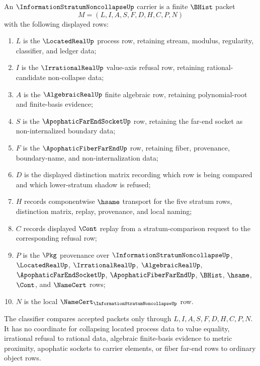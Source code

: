 \begin{definition}
\label{def:information-stratum-noncollapse-carrier}
An $\InformationStratumNoncollapseUp$ carrier is a finite $\BHist$ packet
$$
M=(L,I,A,S,F,D,H,C,P,N)
$$
with the following displayed rows:
\begin{enumerate}
\item $L$ is the $\LocatedRealUp$ process row, retaining stream, modulus, regularity, classifier, and ledger data;
\item $I$ is the $\IrrationalRealUp$ value-axis refusal row, retaining rational-candidate non-collapse data;
\item $A$ is the $\AlgebraicRealUp$ finite algebraic row, retaining polynomial-root and finite-basis evidence;
\item $S$ is the $\ApophaticFarEndSocketUp$ row, retaining the far-end socket as non-internalized boundary data;
\item $F$ is the $\ApophaticFiberFarEndUp$ row, retaining fiber, provenance, boundary-name, and non-internalization data;
\item $D$ is the displayed distinction matrix recording which row is being compared and which lower-stratum shadow is refused;
\item $H$ records componentwise $\hsame$ transport for the five stratum rows, distinction matrix, replay, provenance, and local naming;
\item $C$ records displayed $\Cont$ replay from a stratum-comparison request to the corresponding refusal row;
\item $P$ is the $\Pkg$ provenance over $\InformationStratumNoncollapseUp$, $\LocatedRealUp$, $\IrrationalRealUp$, $\AlgebraicRealUp$, $\ApophaticFarEndSocketUp$, $\ApophaticFiberFarEndUp$, $\BHist$, $\hsame$, $\Cont$, and $\NameCert$ rows;
\item $N$ is the local $\NameCert_{\InformationStratumNoncollapseUp}$ row.
\end{enumerate}
The classifier compares accepted packets only through $L,I,A,S,F,D,H,C,P,N$. It has no coordinate for collapsing located process data to value equality, irrational refusal to rational data, algebraic finite-basis evidence to metric proximity, apophatic sockets to carrier elements, or fiber far-end rows to ordinary object rows.
\end{definition}

